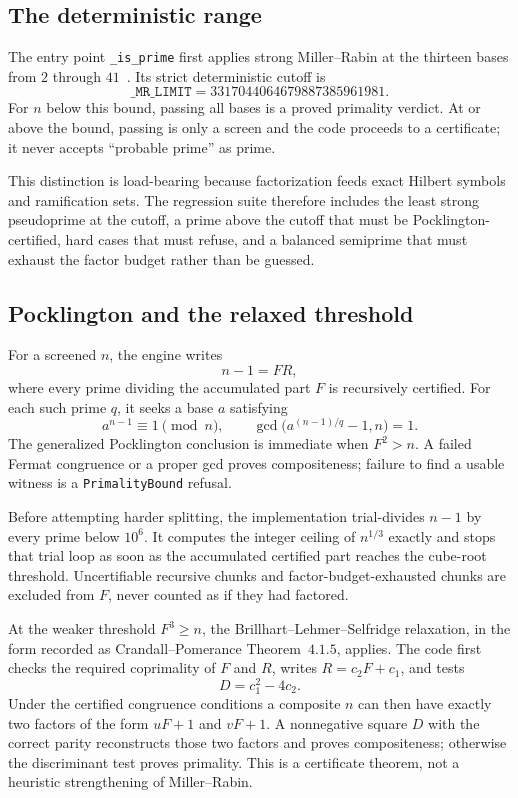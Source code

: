 \documentclass[11pt]{amsart}%
\begin{document}
\subsection{The deterministic range}
The entry point \texttt{\_is\_prime} first applies strong Miller--Rabin at the
thirteen bases from \(2\) through \(41\)~\cite{jaeschke}.  Its strict deterministic cutoff is
\[
  \texttt{\_MR\_LIMIT}=3317044064679887385961981.
\]
For \(n\) below this bound, passing all bases is a proved primality verdict.
At or above the bound, passing is only a screen and the code proceeds to a
certificate; it never accepts ``probable prime'' as prime.

This distinction is load-bearing because factorization feeds exact Hilbert
symbols and ramification sets.  The regression suite therefore includes the
least strong pseudoprime at the cutoff, a prime above the cutoff that must be
Pocklington-certified, hard cases that must refuse, and a balanced semiprime
that must exhaust the factor budget rather than be guessed.

\subsection{Pocklington and the relaxed threshold}
For a screened \(n\), the engine writes
\[
 n-1=FR,
\]
where every prime dividing the accumulated part \(F\) is recursively
certified.  For each such prime \(q\), it seeks a base \(a\) satisfying
\[
 a^{n-1}\equiv 1\pmod n,
 \qquad
 \gcd\bigl(a^{(n-1)/q}-1,n\bigr)=1.
\]
The generalized Pocklington conclusion is immediate when \(F^2>n\).  A
failed Fermat congruence or a proper gcd proves compositeness; failure to find a
usable witness is a \texttt{PrimalityBound} refusal.

Before attempting harder splitting, the implementation trial-divides \(n-1\)
by every prime below \(10^6\).  It computes the integer ceiling of \(n^{1/3}\)
exactly and stops that trial loop as soon as the accumulated certified part
reaches the cube-root threshold.  Uncertifiable recursive chunks and
factor-budget-exhausted chunks are excluded from \(F\), never counted as if
they had factored.

At the weaker threshold \(F^3\ge n\), the
Brillhart--Lehmer--Selfridge relaxation, in the form recorded as
Crandall--Pomerance Theorem~\(4.1.5\), applies.  The code first checks the
required coprimality of \(F\) and \(R\), writes \(R=c_2F+c_1\), and tests
\[
 D=c_1^2-4c_2.
\]
Under the certified congruence conditions a composite \(n\) can then have
exactly two factors of the form \(uF+1\) and \(vF+1\).  A nonnegative square
\(D\) with the correct parity reconstructs those two factors and proves
compositeness; otherwise the discriminant test proves primality.  This is a
certificate theorem, not a heuristic strengthening of Miller--Rabin.
\end{document}
